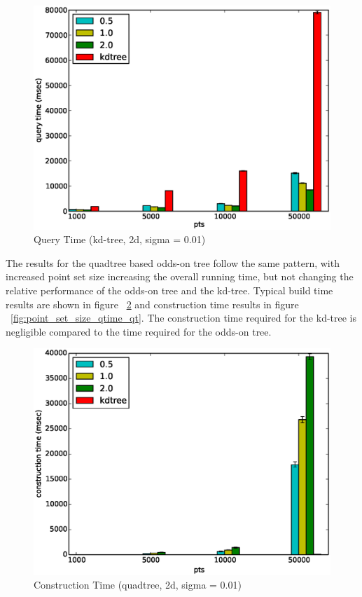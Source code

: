 \documentclass[mcs]{scsthesis}
\begin{document}
\begin{figure}
\begin{center}
\includegraphics[scale=0.5]{diagrams/2d_group_bypts_sigma0.01_qtime.eps}
\caption{Query Time (kd-tree, 2d, sigma = 0.01)}
\label{fig:point_set_size_qtime}
\end{center}
\end{figure}

The results for the quadtree based odds-on tree follow the same pattern, with
increased point set size increasing the overall running time, but not changing
the relative performance of the odds-on tree and the kd-tree. Typical build
time results are shown in figure ~\ref{fig:point_set_size_ctime_qt} and
construction time results in figure ~\ref{fig:point_set_size_qtime_qt}. The
construction time required for the kd-tree is negligible compared to the time
required for the odds-on tree.

\begin{figure}
\begin{center}
\includegraphics[scale=0.5]{diagrams/2d_group_bypts_sigma0.01_ctime_qt.eps}
\caption{Construction Time (quadtree, 2d, sigma = 0.01)}
\label{fig:point_set_size_ctime_qt}
\end{center}
\end{figure}
\end{document}
